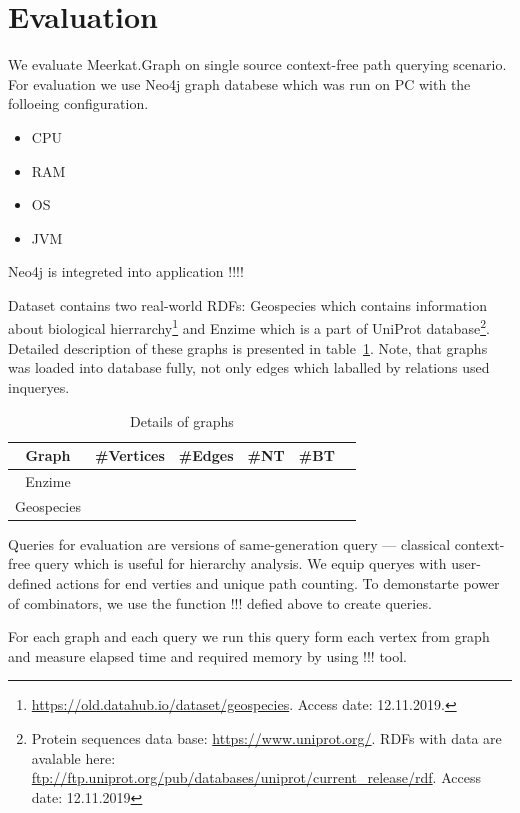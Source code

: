 \section{Evaluation}

We evaluate Meerkat.Graph on single source context-free path querying scenario.
For evaluation we use Neo4j graph databese which was run on PC with the folloeing configuration.
\begin{itemize}
  \item CPU
  \item RAM
  \item OS
  \item JVM
\end{itemize}

Neo4j is integreted into application !!!!

Dataset contains two real-world RDFs: Geospecies which contains information about biological hierrarchy\footnote{\url{https://old.datahub.io/dataset/geospecies}. Access date: 12.11.2019.} and Enzime which is a part of UniProt database\footnote{Protein sequences data base: \url{https://www.uniprot.org/}. RDFs with data are avalable here: \url{ftp://ftp.uniprot.org/pub/databases/uniprot/current_release/rdf}. Access date: 12.11.2019}.
Detailed description of these graphs is presented in table~\ref{tbl:datasetDetails}.
Note, that graphs was loaded into database fully, not only edges which laballed by relations used inqueryes.

\begin{table}[ht]
\begin{tabular}{|c|c|c|c|c|c|}
\hline
 Graph & \#Vertices & \#Edges & \#NT & \#BT \\
 \hline
 Enzime &  &  &  &  \\
 Geospecies &  &  &  &  \\
 \hline
\end{tabular}
\caption{Details of graphs}
\label{tbl:datasetDetails}
\end{table}

Queries for evaluation are versions of same-generation query --- classical context-free query which is useful for hierarchy analysis.
We equip queryes with user-defined actions for end verties and unique path counting.
To demonstarte power of combinators, we use the function !!! defied above to create queries.

For each graph and each query we run this query form each vertex from graph and measure elapsed time and required memory by using !!! tool.

